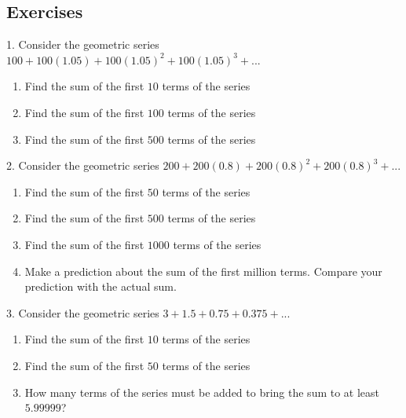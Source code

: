\documentclass[10pt,]{book}
\theoremstyle{plain}
\theoremstyle{definition}
\theoremstyle{definition}
\theoremstyle{definition}
\numberwithin{equation}{section}
\begin{document}
\subsection[{Exercises}]{Exercises}\label{exercises-6}
\begin{exerciselist}
\item[1.]\hypertarget{exercise-32}{}\hypertarget{p-173}{}%
Consider the geometric series \(100+100(1.05)+100(1.05)^2+100(1.05)^3+...\)%
\leavevmode%
\begin{enumerate}[label=(\alph*)]
\item\hypertarget{li-65}{}Find the sum of the first \(10\) terms of the series%
\item\hypertarget{li-66}{}Find the sum of the first \(100\) terms of the series%
\item\hypertarget{li-67}{}Find the sum of the first \(500\) terms of the series%
\end{enumerate}
\par\smallskip
\item[2.]\hypertarget{exercise-33}{}\hypertarget{p-174}{}%
Consider the geometric series \(200+200(0.8)+200(0.8)^2+200(0.8)^3+...\)%
\leavevmode%
\begin{enumerate}[label=(\alph*)]
\item\hypertarget{li-68}{}Find the sum of the first \(50\) terms of the series%
\item\hypertarget{li-69}{}Find the sum of the first \(500\) terms of the series%
\item\hypertarget{li-70}{}Find the sum of the first \(1000\) terms of the series%
\item\hypertarget{li-71}{}Make a prediction about the sum of the first million terms. Compare your prediction with the actual sum.%
\end{enumerate}
\par\smallskip
\item[3.]\hypertarget{exercise-34}{}\hypertarget{p-175}{}%
Consider the geometric series \(3+1.5+0.75+0.375+...\)%
\leavevmode%
\begin{enumerate}[label=(\alph*)]
\item\hypertarget{li-72}{}Find the sum of the first \(10\) terms of the series%
\item\hypertarget{li-73}{}Find the sum of the first \(50\) terms of the series%
\item\hypertarget{li-74}{}How many terms of the series must be added to bring the sum to at least \(5.99999\)?%
\end{enumerate}

\end{exerciselist}
\end{document}
